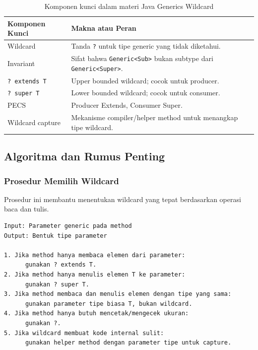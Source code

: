 \begin{table}[H]
\centering
\begin{tabularx}{\textwidth}{|L{0.28\textwidth}|X|}
\hline
\textbf{Komponen Kunci} & \textbf{Makna atau Peran} \\
\hline
Wildcard & Tanda \texttt{?} untuk tipe generic yang tidak diketahui. \\
\hline
Invariant & Sifat bahwa \texttt{Generic<Sub>} bukan subtype dari \texttt{Generic<Super>}. \\
\hline
\texttt{? extends T} & Upper bounded wildcard; cocok untuk producer. \\
\hline
\texttt{? super T} & Lower bounded wildcard; cocok untuk consumer. \\
\hline
PECS & Producer Extends, Consumer Super. \\
\hline
Wildcard capture & Mekanisme compiler/helper method untuk menangkap tipe wildcard. \\
\hline
\end{tabularx}
\caption{Komponen kunci dalam materi Java Generics Wildcard}
\label{tab:komponen-kunci-java-wildcard}
\end{table}

\subsection{Algoritma dan Rumus Penting}

\subsubsection{Prosedur Memilih Wildcard}

\begin{jawab}
Prosedur ini membantu menentukan wildcard yang tepat berdasarkan operasi baca dan tulis.
\end{jawab}

\begin{lstlisting}[caption={Pseudocode memilih wildcard}, label={lst:wildcard-decision}]
Input: Parameter generic pada method
Output: Bentuk tipe parameter

1. Jika method hanya membaca elemen dari parameter:
      gunakan ? extends T.
2. Jika method hanya menulis elemen T ke parameter:
      gunakan ? super T.
3. Jika method membaca dan menulis elemen dengan tipe yang sama:
      gunakan parameter tipe biasa T, bukan wildcard.
4. Jika method hanya butuh mencetak/mengecek ukuran:
      gunakan ?.
5. Jika wildcard membuat kode internal sulit:
      gunakan helper method dengan parameter tipe untuk capture.
\end{lstlisting}

